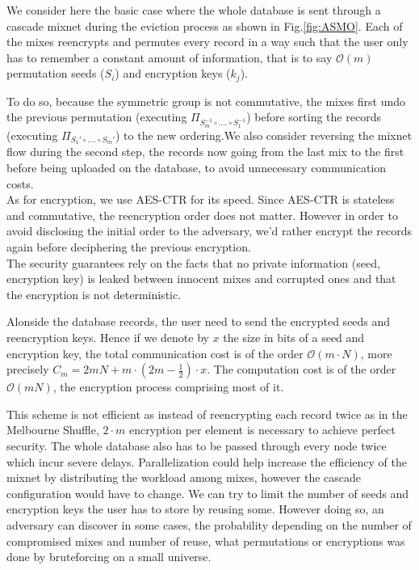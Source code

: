\documentclass[english,oneside,twocolumn]{article}
\begin{document}
We consider here the basic case where the whole database is sent through a cascade mixnet during the eviction process as shown in Fig.\ref{fig:ASMO}.
Each of the mixes reencrypts and permutes every record in a way such that the user only has to remember a constant amount of information, that is to say $\mathcal{O}\left ( m \right )$ permutation seeds ($S_i$) and encryption keys ($k_j$).

To do so, because the symmetric group is not commutative, the mixes first undo the previous permutation (executing $\Pi_{S_m^{-1} \circ .... \circ S_1^{-1}}$) before sorting the records (executing $\Pi_{S_1' \circ .... \circ S_m'}$) to the new ordering.We also consider reversing the mixnet flow during the second step, the records now going from the last mix to the first before being uploaded on the database, to avoid unnecessary communication costs.\\
As for encryption, we use AES-CTR for its speed. Since AES-CTR is stateless and commutative, the reencryption order does not matter. However in order to avoid disclosing the initial order to the adversary, we'd rather encrypt the records again before deciphering the previous encryption.\\
The security guarantees rely on the facts that no private information (seed, encryption key) is leaked between innocent mixes and corrupted ones and that the encryption is not deterministic.

Alonside the database records, the user need to send the encrypted seeds and reencryption keys. Hence if we denote by $x$ the size in bits of a seed and encryption key, the total communication cost is of the order $\mathcal{O}\left ( m\cdot N \right )$, more precisely $C_m=2mN + m\cdot(2m-\frac{1}{2})\cdot x$.
The computation cost is of the order $\mathcal{O}\left(mN\right)$, the encryption process comprising most of it.

This scheme is not efficient as instead of reencrypting each record twice as in the Melbourne Shuffle, $2\cdot m$ encryption per element is necessary to achieve perfect security. The whole database also has to be passed through every node twice which incur severe delays. Parallelization could help increase the efficiency of the mixnet by distributing the workload among mixes, however the cascade configuration would have to change.
We can try to limit the number of seeds and encryption keys the user has to store by reusing some. However doing so, an adversary can discover in some cases, the probability depending on the number of compromised mixes and number of reuse, what permutations or encryptions was done by bruteforcing on a small universe.
\end{document}
